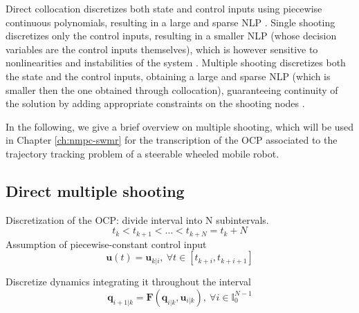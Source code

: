 Direct collocation discretizes both state and
control inputs using 
piecewise continuous polynomials, resulting in a large and sparse NLP
\cite{Hargraves1986Collocation}.
Single shooting discretizes only the control inputs, resulting in a smaller NLP
(whose decision variables are the control inputs themselves), which is however
sensitive to nonlinearities and instabilities of the system
\cite{Zanon2017DirectOptimalControlandMPC}. Multiple shooting discretizes 
both the state and the control inputs, obtaining a large and sparse NLP (which 
is smaller then the one obtained through collocation), guaranteeing continuity
of the solution by adding appropriate constraints on the shooting nodes
\cite{Bock1984MultipleShooting}.

In the following, we give a brief overview on multiple shooting, which will be 
used in Chapter \ref{ch:nmpc-swmr} for the transcription of the OCP associated 
to the trajectory tracking problem of a steerable wheeled mobile robot.

\subsection{Direct multiple shooting}
Discretization of the OCP: divide interval into N subintervals.
\begin{equation*}
    t_k < t_{k+1} < \dots < t_{k+N} = t_k + N
\end{equation*}
Assumption of piecewise-constant control input
\begin{equation*}
    \bm{u}(t) = \bm{u}_{k|i}, \ \forall t \in [t_{k+i}, t_{k+i+1}]
\end{equation*}

Discretize dynamics integrating it throughout the interval
\begin{equation*}
    \bm{q}_{i+1|k} = \bm{F}(\bm{q}_{i|k}, \bm{u}_{i|k}), \ \forall i \in \mathbb{I}_{0}^{N-1}
\end{equation*}

